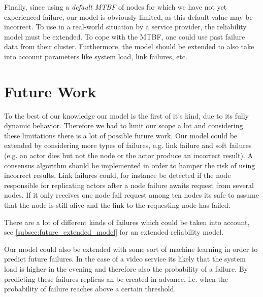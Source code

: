 \documentclass{cslthse-msc}
\begin{document}
Finally, since using a \emph{default MTBF} of nodes for which we have not yet experienced failure, our model is obviously limited, as this default value may be incorrect. To use in a real-world situation by a service provider, the reliability model must be extended. To cope with the MTBF, one could use past failure data from their cluster. Furthermore, the model should be extended to also take into account parameters like system load, link failures, etc. 


\chapter{Future Work} \label{ch:future_work}
To the best of our knowledge our model is the first of it's kind, due to its fully dynamic behavior. Therefore we had to limit our scope a lot and considering these limitations there is a lot of possible future work. Our model could be extended by considering more types of failures, e.g. link failure and soft failures (e.g. an actor dies but not the node or the actor produce an incorrect result). A consensus algorithm should be implemented in order to hamper the risk of using incorrect results. Link failures could, for instance be detected if the node responsible for replicating actors after a node failure awaits request from several nodes. If it only receives one node fail request among ten nodes its safe to assume that the node is still alive and the link to the requesting node has failed.

There are a lot of different kinds of failures which could be taken into account, see \cref{subsec:future_extended_model} for an extended reliability model.

Our model could also be extended with some sort of machine learning in order to predict future failures. In the case of a video service its likely that the system load is higher in the evening and therefore also the probability of a failure. By predicting these failures replicas an be created in advance, i.e. when the probability of failure reaches above a certain threshold.
\end{document}
